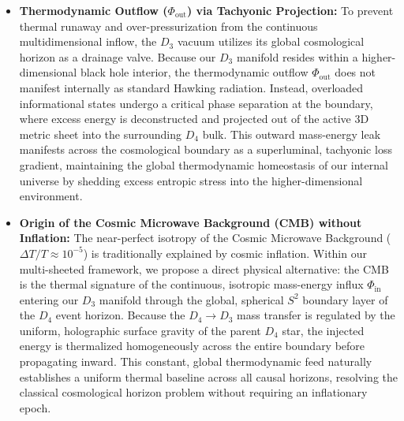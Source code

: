 \documentclass[twocolumn]{aa}
\begin{document}
\begin{itemize}
    \item \textbf{Thermodynamic Outflow ($\Phi_{\text{out}}$) via Tachyonic Projection:} To prevent thermal runaway and over-pressurization from the continuous multidimensional inflow, the $D_3$ vacuum utilizes its global cosmological horizon as a drainage valve. Because our $D_3$ manifold resides within a higher-dimensional black hole interior, the thermodynamic outflow $\Phi_{\text{out}}$ does not manifest internally as standard Hawking radiation. Instead, overloaded informational states undergo a critical phase separation at the boundary, where excess energy is deconstructed and projected out of the active 3D metric sheet into the surrounding $D_4$ bulk. This outward mass-energy leak manifests across the cosmological boundary as a superluminal, tachyonic loss gradient, maintaining the global thermodynamic homeostasis of our internal universe by shedding excess entropic stress into the higher-dimensional environment.
    
    \vspace{1em}

    \item \textbf{Origin of the Cosmic Microwave Background (CMB) without Inflation:} The near-perfect isotropy of the Cosmic Microwave Background ($\Delta T/T \approx 10^{-5}$) is traditionally explained by cosmic inflation. Within our multi-sheeted framework, we propose a direct physical alternative: the CMB is the thermal signature of the continuous, isotropic mass-energy influx $\Phi_{\text{in}}$ entering our $D_3$ manifold through the global, spherical $S^2$ boundary layer of the $D_4$ event horizon. Because the $D_4 \rightarrow D_3$ mass transfer is regulated by the uniform, holographic surface gravity of the parent $D_4$ star, the injected energy is thermalized homogeneously across the entire boundary before propagating inward. This constant, global thermodynamic feed naturally establishes a uniform thermal baseline across all causal horizons, resolving the classical cosmological horizon problem without requiring an inflationary epoch.
\end{itemize}
\end{document}
